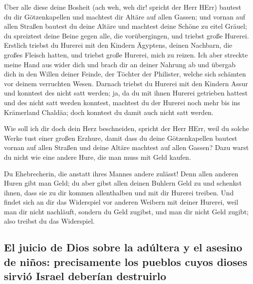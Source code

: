  Über alle diese deine Bosheit (ach weh, weh dir! spricht
der Herr HErr)  bautest du dir Götzenkapellen und
machtest dir Altäre auf allen Gassen;  und vornan auf
allen Straßen bautest du deine Altäre und machtest deine Schöne zu eitel
Gräuel; du spreiztest deine Beine gegen alle, die vorübergingen, und
triebst große Hurerei.  Erstlich triebst du Hurerei mit
den Kindern Ägyptens, deinen Nachbarn, die großes Fleisch hatten, und
triebst große Hurerei, mich zu reizen.  Ich aber streckte
meine Hand aus wider dich und brach dir an deiner Nahrung ab und übergab
dich in den Willen deiner Feinde, der Töchter der Philister, welche sich
schämten vor deinem verruchten Wesen.  Darnach triebst du
Hurerei mit den Kindern Assur und konntest des nicht satt werden; ja, da
du mit ihnen Hurerei getrieben hattest und des nicht satt werden
konntest,  machtest du der Hurerei noch mehr bis ins
Krämerland Chaldäa; doch konntest du damit auch nicht satt werden.

 Wie soll ich dir doch dein Herz beschneiden, spricht der
Herr HErr, weil du solche Werke tust einer großen Erzhure,
 damit dass du deine Götzenkapellen bautest vornan auf
allen Straßen und deine Altäre machtest auf allen Gassen? Dazu warst du
nicht wie eine andere Hure, die man muss mit Geld kaufen.

 Du Ehebrecherin, die anstatt ihres Mannes andere
zulässt!  Denn allen anderen Huren gibt man Geld; du aber
gibst allen deinen Buhlern Geld zu und schenkst ihnen, dass sie zu dir
kommen allenthalben und mit dir Hurerei treiben.  Und
findet sich an dir das Widerspiel vor anderen Weibern mit deiner
Hurerei, weil man dir nicht nachläuft, sondern du Geld zugibst, und man
dir nicht Geld zugibt; also treibst du das Widerspiel.

\hypertarget{el-juicio-de-dios-sobre-la-aduxfaltera-y-el-asesino-de-niuxf1os-precisamente-los-pueblos-cuyos-dioses-sirviuxf3-israel-deberuxedan-destruirlo}{%
\subsection{El juicio de Dios sobre la adúltera y el asesino de niños:
precisamente los pueblos cuyos dioses sirvió Israel deberían
destruirlo}\label{el-juicio-de-dios-sobre-la-aduxfaltera-y-el-asesino-de-niuxf1os-precisamente-los-pueblos-cuyos-dioses-sirviuxf3-israel-deberuxedan-destruirlo}}

